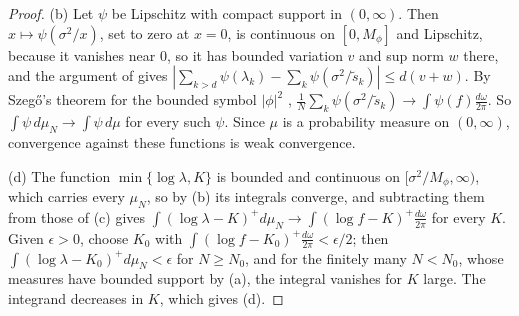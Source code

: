 \documentclass[11pt,onecolumn]{IEEEtran}
\newcommand{\dw}{\tfrac{d\omega}{2\pi}}
\begin{document}
\begin{proof}
(b) Let $\psi$ be Lipschitz with compact support in $(0,\infty)$. Then
$x\mapsto\psi(\sigma^2/x)$, set to zero at $x=0$, is continuous on
$[0,M_\phi]$ and Lipschitz, because it vanishes near $0$, so it has
bounded variation $v$ and sup norm $w$ there, and the argument of
\cite[proof of Lemma~25(b)]{part3} gives
$|\sum_{k>d}\psi(\lambda_k)-\sum_k\psi(\sigma^2/\tilde s_k)|\le d(v+w)$. By
Szeg\H{o}'s theorem for the bounded symbol $|\phi|^2$ \cite{grenander1958},
$\tfrac1N\sum_k\psi(\sigma^2/\tilde s_k)\to\int\psi(f)\dw$. So
$\int\psi\,d\mu_N\to\int\psi\,d\mu$ for every such $\psi$. Since $\mu$ is a
probability measure on $(0,\infty)$, convergence against these
functions is weak convergence.

(d) The function $\min\{\log\lambda,K\}$ is bounded and continuous on
$[\sigma^2/M_\phi,\infty)$, which carries every $\mu_N$, so by (b) its
integrals converge, and subtracting them from those of (c) gives
$\int(\log\lambda-K)^+d\mu_N\to\int(\log f-K)^+\dw$ for every $K$. Given
$\epsilon>0$, choose $K_0$ with $\int(\log f-K_0)^+\dw<\epsilon/2$; then
$\int(\log\lambda-K_0)^+d\mu_N<\epsilon$ for $N\ge N_0$, and for the finitely
many $N<N_0$, whose measures have bounded support by (a), the integral
vanishes for $K$ large. The integrand decreases in $K$, which gives (d).
\end{proof}
\end{document}
